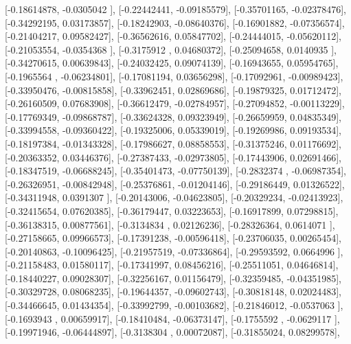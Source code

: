 \documentclass{article}
\begin{document}
       [-0.18614878, -0.0305042 ],
       [-0.22442441, -0.09185579],
       [-0.35701165, -0.02378476],
       [-0.34292195,  0.03173857],
       [-0.18242903, -0.08640376],
       [-0.16901882, -0.07356574],
       [-0.21404217,  0.09582427],
       [-0.36562616,  0.05847702],
       [-0.24444015, -0.05620112],
       [-0.21053554, -0.0354368 ],
       [-0.3175912 ,  0.04680372],
       [-0.25094658,  0.0140935 ],
       [-0.34270615,  0.00639843],
       [-0.24032425,  0.09074139],
       [-0.16943655,  0.05954765],
       [-0.1965564 , -0.06234801],
       [-0.17081194,  0.03656298],
       [-0.17092961, -0.00989423],
       [-0.33950476, -0.00815858],
       [-0.33962451,  0.02869686],
       [-0.19879325,  0.01712472],
       [-0.26160509,  0.07683908],
       [-0.36612479, -0.02784957],
       [-0.27094852, -0.00113229],
       [-0.17769349, -0.09868787],
       [-0.33624328,  0.09323949],
       [-0.26659959,  0.04835349],
       [-0.33994558, -0.09360422],
       [-0.19325006,  0.05339019],
       [-0.19269986,  0.09193534],
       [-0.18197384, -0.01343328],
       [-0.17986627,  0.08858553],
       [-0.31375246,  0.01176692],
       [-0.20363352,  0.03446376],
       [-0.27387433, -0.02973805],
       [-0.17443906,  0.02691466],
       [-0.18347519, -0.06688245],
       [-0.35401473, -0.07750139],
       [-0.2832374 , -0.06987354],
       [-0.26326951, -0.00842948],
       [-0.25376861, -0.01204146],
       [-0.29186449,  0.01326522],
       [-0.34311948,  0.0391307 ],
       [-0.20143006, -0.04623805],
       [-0.20329234, -0.02413923],
       [-0.32415654,  0.07620385],
       [-0.36179447,  0.03223653],
       [-0.16917899,  0.07298815],
       [-0.36138315,  0.00877561],
       [-0.3134834 ,  0.02126236],
       [-0.28326364,  0.0614071 ],
       [-0.27158665,  0.09966573],
       [-0.17391238, -0.00596418],
       [-0.23706035,  0.00265454],
       [-0.20140863, -0.10096425],
       [-0.21957519, -0.07336864],
       [-0.29593592,  0.0664996 ],
       [-0.21158483,  0.01580117],
       [-0.17341997,  0.08456216],
       [-0.25511051,  0.04646814],
       [-0.18440227,  0.09028307],
       [-0.32256167,  0.01156479],
       [-0.32359485, -0.04351985],
       [-0.30329728,  0.08068235],
       [-0.19644357, -0.09602743],
       [-0.30818148,  0.02024483],
       [-0.34466645,  0.01434354],
       [-0.33992799, -0.00103682],
       [-0.21846012, -0.0537063 ],
       [-0.1693943 ,  0.00659917],
       [-0.18410484, -0.06373147],
       [-0.1755592 , -0.0629117 ],
       [-0.19971946, -0.06444897],
       [-0.3138304 ,  0.00072087],
       [-0.31855024,  0.08299578],
\end{document}
